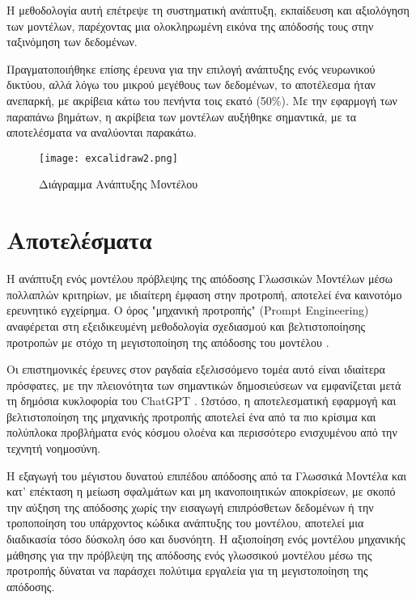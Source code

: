 Η μεθοδολογία αυτή επέτρεψε τη συστηματική ανάπτυξη, εκπαίδευση και
αξιολόγηση των μοντέλων, παρέχοντας μια ολοκληρωμένη εικόνα της απόδοσής
τους στην ταξινόμηση των δεδομένων.

Πραγματοποιήθηκε επίσης έρευνα για την επιλογή ανάπτυξης ενός νευρωνικού
δικτύου, αλλά λόγω του μικρού μεγέθους των δεδομένων, το αποτέλεσμα ήταν
ανεπαρκή, με ακρίβεια κάτω του πενήντα τοις εκατό (50\%). Με την
εφαρμογή των παραπάνω βημάτων, η ακρίβεια των μοντέλων αυξήθηκε
σημαντικά, με τα αποτελέσματα να αναλύονται παρακάτω.

\begin{figure}[H]
  \begin{center}
    \texttt{[image: excalidraw2.png]}
    \caption{Διάγραμμα Ανάπτυξης Μοντέλου}
  \end{center}
  \label{fig:excalidraw2}
\end{figure}

\section{Αποτελέσματα}

Η ανάπτυξη ενός μοντέλου πρόβλεψης της απόδοσης Γλωσσικών Μοντέλων μέσω
πολλαπλών κριτηρίων, με ιδιαίτερη έμφαση στην προτροπή, αποτελεί ένα
καινοτόμο ερευνητικό εγχείρημα. Ο όρος "μηχανική προτροπής"
(\textlatin{Prompt Engineering}) αναφέρεται στη εξειδικευμένη
μεθοδολογία σχεδιασμού και βελτιστοποίησης προτροπών με στόχο τη
μεγιστοποίηση της απόδοσης του μοντέλου \cite{10.1162/tacl_a_00324,
chen2024unleashingpotentialpromptengineering}.

Οι επιστημονικές έρευνες στον ραγδαία εξελισσόμενο τομέα αυτό είναι
ιδιαίτερα πρόσφατες, με την πλειονότητα των σημαντικών δημοσιεύσεων να
εμφανίζεται μετά τη δημόσια κυκλοφορία του \textlatin{ChatGPT}
\cite{greshake2023youvesignedforcompromising,
white2023promptpatterncatalogenhance}. Ωστόσο, η αποτελεσματική
εφαρμογή και βελτιστοποίηση της μηχανικής προτροπής αποτελεί ένα από τα
πιο κρίσιμα και πολύπλοκα προβλήματα ενός κόσμου ολοένα και περισσότερο
ενισχυμένου από την τεχνητή νοημοσύνη.

Η εξαγωγή του μέγιστου δυνατού επιπέδου απόδοσης από τα Γλωσσικά
Μοντέλα και κατ' επέκταση η μείωση σφαλμάτων και μη ικανοποιητικών
αποκρίσεων, με σκοπό την αύξηση της απόδοσης χωρίς
την εισαγωγή επιπρόσθετων δεδομένων ή την τροποποίηση του υπάρχοντος
κώδικα ανάπτυξης του μοντέλου, αποτελεί μια διαδικασία τόσο δύσκολη όσο
και δυσνόητη. Η αξιοποίηση ενός μοντέλου μηχανικής μάθησης για την
πρόβλεψη της απόδοσης ενός γλωσσικού μοντέλου μέσω της προτροπής
δύναται να παράσχει πολύτιμα εργαλεία για τη μεγιστοποίηση της απόδοσης.

